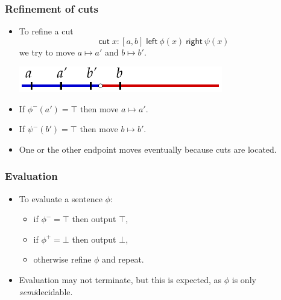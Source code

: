 \documentclass{beamer}
\newcommand{\cut}[3]{\mathsf{cut}\; #1\; \mathsf{left}\ #2\ 
  \mathsf{right}\  #3}
\begin{document}
\begin{frame}
  \frametitle{Refinement of cuts}

  \begin{itemize}\item 
    To refine a cut
    \begin{equation*}
      \cut{x : [a,b]}{\phi(x)}{\psi(x)}
    \end{equation*}
    we try to move $a \mapsto a'$ and $b \mapsto b'$.
    \bigskip
    \begin{center}
      \includegraphics[width=0.7\textwidth]{cut_refine}
    \end{center}
    \bigskip
  \item 
    If $\phi^{-}(a') = \top$ then move $a \mapsto a'$.
  \item 
    If $\psi^{-}(b') = \top$ then move $b \mapsto b'$.
  \item One or the other endpoint moves eventually because cuts are
    located.
  \end{itemize}

\end{frame}


\begin{frame}
  \frametitle{Evaluation}

  \begin{itemize}
  \item To evaluate a sentence $\phi$:
    \begin{itemize}
    \item if $\phi^{-} = \top$ then output $\top$,
    \item if $\phi^{+} = \bot$ then output $\bot$,
    \item otherwise refine $\phi$ and repeat.
    \end{itemize}
  \item Evaluation may not terminate, but this is expected, as $\phi$
    is only \emph{semi}decidable.
  \end{itemize}
\end{frame}
\end{document}
